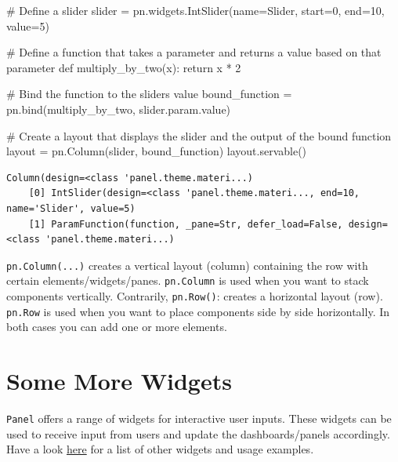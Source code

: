 \documentclass[
  letterpaper,
  DIV=11,
  numbers=noendperiod]{scrreprt}
\newenvironment{Shaded}{\begin{snugshade}}{\end{snugshade}}
\newcommand{\CommentTok}[1]{\textcolor[rgb]{0.37,0.37,0.37}{#1}}
\newcommand{\ControlFlowTok}[1]{\textcolor[rgb]{0.00,0.23,0.31}{#1}}
\newcommand{\DecValTok}[1]{\textcolor[rgb]{0.68,0.00,0.00}{#1}}
\newcommand{\KeywordTok}[1]{\textcolor[rgb]{0.00,0.23,0.31}{#1}}
\newcommand{\NormalTok}[1]{\textcolor[rgb]{0.00,0.23,0.31}{#1}}
\newcommand{\OperatorTok}[1]{\textcolor[rgb]{0.37,0.37,0.37}{#1}}
\newcommand{\StringTok}[1]{\textcolor[rgb]{0.13,0.47,0.30}{#1}}
\begin{document}
\begin{Shaded}
\begin{Highlighting}[]
\CommentTok{\# Define a slider}
\NormalTok{slider }\OperatorTok{=}\NormalTok{ pn.widgets.IntSlider(name}\OperatorTok{=}\StringTok{\textquotesingle{}Slider\textquotesingle{}}\NormalTok{, start}\OperatorTok{=}\DecValTok{0}\NormalTok{, end}\OperatorTok{=}\DecValTok{10}\NormalTok{, value}\OperatorTok{=}\DecValTok{5}\NormalTok{)}

\CommentTok{\# Define a function that takes a parameter and returns a value based on that parameter}
\KeywordTok{def}\NormalTok{ multiply\_by\_two(x):}
    \ControlFlowTok{return}\NormalTok{ x }\OperatorTok{*} \DecValTok{2}

\CommentTok{\# Bind the function to the slider\textquotesingle{}s value}
\NormalTok{bound\_function }\OperatorTok{=}\NormalTok{ pn.bind(multiply\_by\_two, slider.param.value)}

\CommentTok{\# Create a layout that displays the slider and the output of the bound function}
\NormalTok{layout }\OperatorTok{=}\NormalTok{ pn.Column(slider, bound\_function)}
\NormalTok{layout.servable()}
\end{Highlighting}
\end{Shaded}

\begin{verbatim}
Column(design=<class 'panel.theme.materi...)
    [0] IntSlider(design=<class 'panel.theme.materi..., end=10, name='Slider', value=5)
    [1] ParamFunction(function, _pane=Str, defer_load=False, design=<class 'panel.theme.materi...)
\end{verbatim}

\texttt{pn.Column(...)} creates a vertical layout (column) containing
the row with certain elements/widgets/panes. \texttt{pn.Column} is used
when you want to stack components vertically. Contrarily,
\texttt{pn.Row()}: creates a horizontal layout (row). \texttt{pn.Row} is
used when you want to place components side by side horizontally. In
both cases you can add one or more elements.

\hypertarget{some-more-widgets}{%
\section{Some More Widgets}\label{some-more-widgets}}

\texttt{Panel} offers a range of widgets for interactive user inputs.
These widgets can be used to receive input from users and update the
dashboards/panels accordingly. Have a look
\href{https://panel.holoviz.org/reference/index.html\#widgets}{here} for
a list of other widgets and usage examples.
\end{document}
